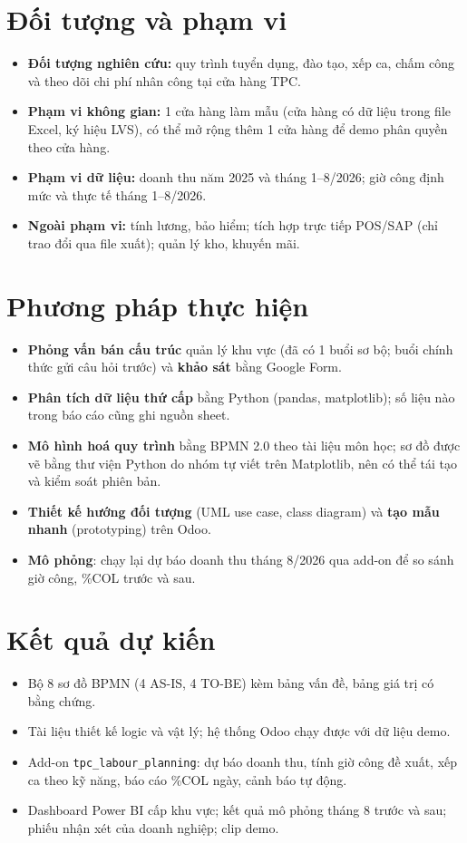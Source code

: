 \documentclass[12pt,a4paper,oneside]{report}
\begin{document}
\section{Đối tượng và phạm vi}
\begin{itemize}
\item \textbf{Đối tượng nghiên cứu:} quy trình tuyển dụng, đào tạo, xếp ca, chấm công và theo dõi chi phí nhân công tại cửa hàng TPC.
\item \textbf{Phạm vi không gian:} 1 cửa hàng làm mẫu (cửa hàng có dữ liệu trong file Excel, ký hiệu LVS), có thể mở rộng thêm 1 cửa hàng để demo phân quyền theo cửa hàng.
\item \textbf{Phạm vi dữ liệu:} doanh thu năm 2025 và tháng 1–8/2026; giờ công định mức và thực tế tháng 1–8/2026.
\item \textbf{Ngoài phạm vi:} tính lương, bảo hiểm; tích hợp trực tiếp POS/SAP (chỉ trao đổi qua file xuất); quản lý kho, khuyến mãi.
\end{itemize}

\section{Phương pháp thực hiện}
\begin{itemize}
\item \textbf{Phỏng vấn bán cấu trúc} quản lý khu vực (đã có 1 buổi sơ bộ; buổi chính thức gửi câu hỏi trước) và \textbf{khảo sát} bằng Google Form.
\item \textbf{Phân tích dữ liệu thứ cấp} bằng Python (pandas, matplotlib); số liệu nào trong báo cáo cũng ghi nguồn sheet.
\item \textbf{Mô hình hoá quy trình} bằng BPMN 2.0 theo tài liệu môn học; sơ đồ được vẽ bằng thư viện Python do nhóm tự viết trên Matplotlib, nên có thể tái tạo và kiểm soát phiên bản.
\item \textbf{Thiết kế hướng đối tượng} (UML use case, class diagram) và \textbf{tạo mẫu nhanh} (prototyping) trên Odoo.
\item \textbf{Mô phỏng}: chạy lại dự báo doanh thu tháng 8/2026 qua add-on để so sánh giờ công, \%COL trước và sau.
\end{itemize}

\section{Kết quả dự kiến}
\begin{itemize}
\item Bộ 8 sơ đồ BPMN (4 AS-IS, 4 TO-BE) kèm bảng vấn đề, bảng giá trị có bằng chứng.
\item Tài liệu thiết kế logic và vật lý; hệ thống Odoo chạy được với dữ liệu demo.
\item Add-on \texttt{tpc\_labour\_planning}: dự báo doanh thu, tính giờ công đề xuất, xếp ca theo kỹ năng, báo cáo \%COL ngày, cảnh báo tự động.
\item Dashboard Power BI cấp khu vực; kết quả mô phỏng tháng 8 trước và sau; phiếu nhận xét của doanh nghiệp; clip demo.
\end{itemize}
\end{document}
